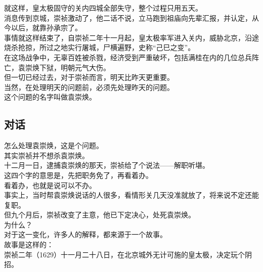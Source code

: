 \begin{multicols}{\theparacolNo}
就这样，皇太极固守的关内四城全部失守，整个过程只用五天。\\

消息传到京城，崇祯激动了，他二话不说，立马跑到祖庙向先辈汇报，并认定，从今以后，就靠孙承宗了。\\

事情就这样结束了，自崇祯二年十一月起，皇太极率军进入关内，威胁北京，沿途烧杀抢掠，所过之地实行屠城，尸横遍野，史称“己巳之变”。\\

在这场战争中，无辜百姓被杀戮，经济受到严重破坏，包括满桂在内的几位总兵阵亡，袁崇焕下狱，明朝元气大伤。\\

但一切已经过去，对于崇祯而言，明天比昨天更重要。\\

当然，在处理明天的问题前，必须先处理昨天的问题。\\

这个问题的名字叫做袁崇焕。\\

\subsection{对话}
怎么处理袁崇焕，这是个问题。\\

其实崇祯并不想杀袁崇焕。\\

十二月一日，逮捕袁崇焕的那天，崇祯给了个说法——解职听堪。\\

这四个字的意思是，先把职务免了，再看着办。\\

看着办，也就是说可以不办。\\

事实上，当时帮袁崇焕说话的人很多，看情形关几天没准就放了，将来说不定还能复职。\\

但九个月后，崇祯改变了主意，他已下定决心，处死袁崇焕。\\

为什么？\\

对于这一变化，许多人的解释，都来源于一个故事。\\

故事是这样的：\\

崇祯二年（1629）十一月二十八日，在北京城外无计可施的皇太极，决定玩个阴招。\\


\end{multicols}
